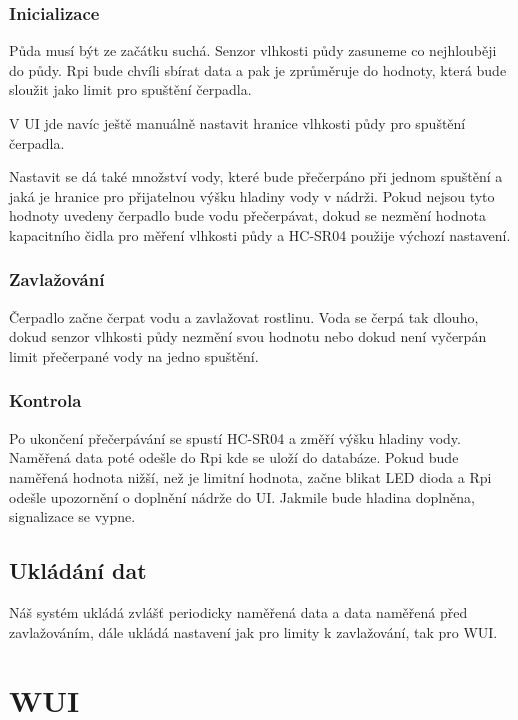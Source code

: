 \documentclass[11pt,a4paper]{article}
\begin{document}
\subsubsection{Inicializace}

Půda musí být ze začátku suchá. Senzor vlhkosti půdy zasuneme co nejhlouběji do
půdy. Rpi bude chvíli sbírat data a pak je zprůměruje do hodnoty, která bude
sloužit jako limit pro spuštění čerpadla.

V UI jde navíc ještě manuálně nastavit hranice vlhkosti půdy pro spuštění
čerpadla.

Nastavit se dá také množství vody, které bude přečerpáno při jednom spuštění a
jaká je hranice pro přijatelnou výšku hladiny vody v nádrži. Pokud nejsou tyto
hodnoty uvedeny čerpadlo bude vodu přečerpávat, dokud se nezmění hodnota
kapacitního čidla pro měření vlhkosti půdy a HC-SR04 použije výchozí nastavení.

\subsubsection{Zavlažování}

Čerpadlo začne čerpat vodu a zavlažovat rostlinu. Voda se čerpá tak dlouho,
dokud senzor vlhkosti půdy nezmění svou hodnotu nebo dokud není vyčerpán limit
přečerpané vody na jedno spuštění.

\subsubsection{Kontrola}

Po ukončení přečerpávání se spustí HC-SR04 a změří výšku hladiny vody. Naměřená
data poté odešle do Rpi kde se uloží do databáze. Pokud bude naměřená hodnota
nižší, než je limitní hodnota, začne blikat LED dioda a Rpi odešle upozornění o
doplnění nádrže do UI. Jakmile bude hladina doplněna, signalizace se vypne.

\subsection{Ukládání dat}

Náš systém ukládá zvlášť periodicky naměřená data a data naměřená před
zavlažováním, dále ukládá nastavení jak pro limity k zavlažování, tak pro
WUI.

\clearpage

\section{WUI}
\end{document}

